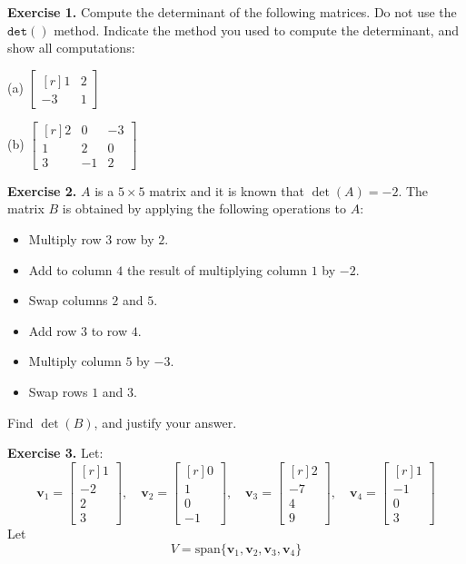 \documentclass[12pt]{article}
\begin{document}
\bigskip
\textbf{Exercise 1.} Compute the determinant of the following matrices. Do not use the $\mathtt{det()}$ method. Indicate the method you used to compute the determinant, and show all computations:

\medskip
(a) $\left[\begin{matrix*}[r]1 & 2\\-3 & 1\end{matrix*}\right]$

\medskip
(b) $\left[\begin{matrix*}[r]2 & 0 & -3\\1 & 2 & 0\\3 & -1 & 2\end{matrix*}\right]$

\bigskip
\textbf{Exercise 2.} $A$ is a $5\times 5$ matrix and it is known that $\det(A)=-2$. The matrix $B$ is obtained by applying the following operations to $A$:
\begin{itemize}
\item Multiply row $3$ row by $2$.
\item Add to column $4$ the result of multiplying column $1$ by $-2$.
\item Swap columns $2$ and $5$.
\item Add row $3$ to row $4$.
\item Multiply column $5$ by $-3$.
\item Swap rows $1$ and $3$. 
\end{itemize} 
Find $\det(B)$, and justify your answer.

\bigskip
\textbf{Exercise 3.} Let:
\[
\mathbf{v}_1=\left[\begin{matrix*}[r]1\\-2\\2\\3\end{matrix*}\right],\quad
\mathbf{v}_2=\left[\begin{matrix*}[r]0\\1\\0\\-1\end{matrix*}\right],\quad
\mathbf{v}_3=\left[\begin{matrix*}[r]2\\-7\\4\\9\end{matrix*}\right],\quad
\mathbf{v}_4=\left[\begin{matrix*}[r]1\\-1\\0\\3\end{matrix*}\right]
\]
Let
\[
V=\text{span}\{\mathbf{v}_1,\mathbf{v}_2,\mathbf{v}_3,\mathbf{v}_4\}
\]
\end{document}
